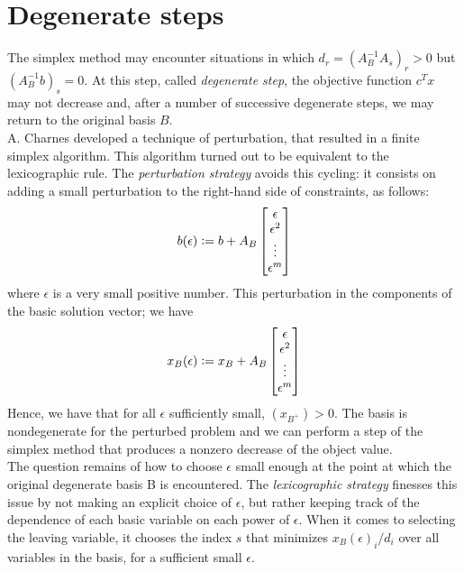 \documentclass[a4paper,10 pt,titlepage,twoside]{book}
\theoremstyle{plain}
\theoremstyle{definition}
\theoremstyle{remark}
\begin{document}
 \section{Degenerate steps}
The simplex method may encounter situations in which $d_{r} = \left( A_{B}^{-1}A_{s}\right)_{r} > 0$ but $(A_{B}^{-1}b)_{s}= 0$. At this step, called \textit{degenerate step}, the objective function $c^{T}x$ may not decrease and, after a number of successive degenerate steps, we may return to the original basis $B$. \\
A. Charnes \cite{Lexico2} developed a technique of perturbation, that resulted in a finite simplex algorithm. This algorithm turned out to be equivalent to the lexicographic rule. The \textit{perturbation strategy} avoids this cycling: it consists on adding a small perturbation to the right-hand side of constraints, as follows:
\begin{equation*}
b(\epsilon) \vcentcolon= b + A_{B}
\begin{bmatrix}
\epsilon\\\epsilon^{2}\\\vdots\\\epsilon^{m}
\end{bmatrix}
\end{equation*}
where $\epsilon$ is a very small positive number. This perturbation in the components of the basic solution vector; we have
\begin{equation*}x_{B}(\epsilon) \vcentcolon= x_{B} + A_{B}
\begin{bmatrix}
\epsilon\\\epsilon^{2}\\\vdots\\\epsilon^{m}
\end{bmatrix}
\end{equation*}
Hence, we have that for all $\epsilon$ sufficiently small, $(x_{B^{+}})>0$. The basis is nondegenerate for the perturbed problem and we can perform a step of the simplex method that produces a nonzero decrease of the object value.\\
The question remains of how to choose $\epsilon$ small enough at the point at which the original degenerate basis B is encountered. The \textit{lexicographic strategy} finesses this issue by not making an explicit choice of $\epsilon$, but rather keeping track of the dependence of each basic variable on each power of $\epsilon$. When it comes to selecting the leaving variable, it chooses the index $s$ that minimizes $x_{B}(\epsilon)_{i}/d_{i}$ over all variables in the basis, for a sufficient small $\epsilon$.\\
\end{document}
